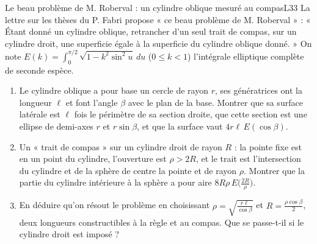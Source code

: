 \documentclass[11pt,a4paper]{article}
\begin{document}
\begin{exercice}{Le beau problème de M. Roberval : un cylindre oblique mesuré au compas}{L3}{3}
La lettre sur les thèses du P. Fabri propose « ce beau problème de M. Roberval » : « Étant donné un
cylindre oblique, retrancher d'un seul trait de compas, sur un cylindre droit, une
superficie égale à la superficie du cylindre oblique donné. » On note
$E(k) = \int_0^{\pi/2}\sqrt{1 - k^2\sin^2u}\,du$ ($0 \le k < 1$) l'intégrale
elliptique complète de seconde espèce.


\begin{enumerate}
\item Le cylindre oblique a pour base un cercle de rayon $r$, ses génératrices ont
  la longueur $\ell$ et font l'angle $\beta$ avec le plan de la base. Montrer que
  sa surface latérale est $\ell$ fois le périmètre de sa section droite, que cette
  section est une ellipse de demi-axes $r$ et $r\sin\beta$, et que la surface vaut
  $4r\ell\,E(\cos\beta)$.
\item Un « trait de compas » sur un cylindre droit de rayon $R$ : la pointe fixe est
  en un point du cylindre, l'ouverture est $\rho > 2R$, et le trait est
  l'intersection du cylindre et de la sphère de centre la pointe et de rayon
  $\rho$. Montrer que la partie du cylindre intérieure à la sphère a pour aire
  $8R\rho\,E\bigl(\frac{2R}{\rho}\bigr)$.
\item En déduire qu'on résout le problème en choisissant $\rho = \sqrt{\frac{r\ell}{\cos\beta}}$
  et $R = \frac{\rho\cos\beta}{2}$, deux longueurs constructibles à la règle et au
  compas. Que se passe-t-il si le cylindre droit est imposé ?
\end{enumerate}
\end{exercice}
\end{document}
